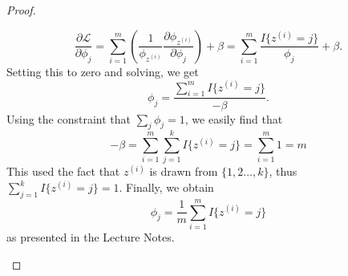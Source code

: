 \documentclass{article}
\begin{document}
\begin{proof}
\begin{enumerate}
            \[
            \frac{\partial{\mathcal{L}}}{\partial{\phi_j}}%
            =\sum_{i=1}^m\left(\frac{1}{\phi_{z^{(i)}}}\frac{\partial{\phi_{z^{(i)}}}}{\partial{\phi_j}}\right)+\beta%
            =\sum_{i=1}^m\frac{I\{z^{(i)}=j\}}{\phi_j}+\beta.
            \]
            Setting this to zero and solving, we get
            \[
            \phi_j=\frac{\sum_{i=1}^mI\{z^{(i)}=j\}}{-\beta}.
            \]
            Using the constraint that $\sum_j\phi_j=1$, we easily find that
            \[
            -\beta=\sum_{i=1}^m \sum_{j=1}^k I\{z^{(i)}=j\}=\sum_{i=1}^m 1 = m
            \]
            This used the fact that $z^{(i)}$ is drawn from $\{1,2\ldots,k\}$, thus $\sum_{j=1}^k I\{z^{(i)}=j\}=1$. Finally, we obtain
            \[
            \phi_j=\frac{1}{m}\sum_{i=1}^mI\{z^{(i)}=j\}
            \]
            as presented in the Lecture Notes.



\end{enumerate}
\end{proof}
\end{document}
